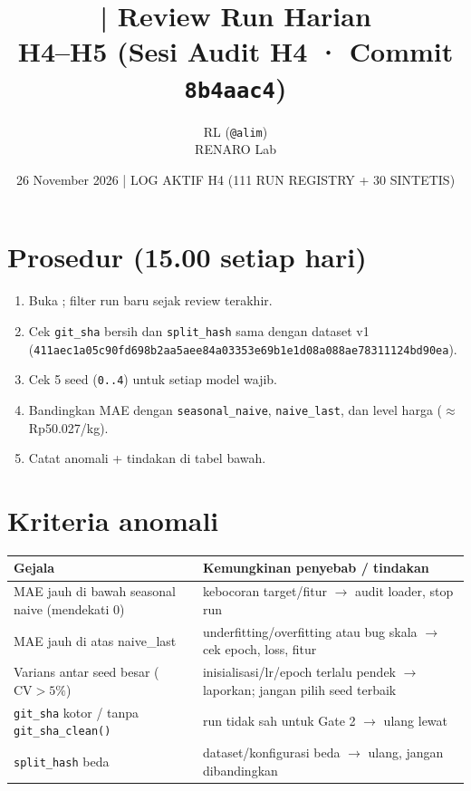 \documentclass[11pt,a4paper]{article}
\title{\jobid{RL-H4-02} | Review Run Harian\\
\large H4--H5 (Sesi Audit H4 · Commit \texttt{8b4aac4})}
\author{RL (\texttt{@alim}) \\ \small RENARO Lab}
\date{26 November 2026 \quad | \quad \textcolor{blue!70!black}{LOG AKTIF H4 (111 RUN REGISTRY + 30 SINTETIS)}}
\begin{document}
\maketitle

\section{Prosedur (15.00 setiap hari)}
\begin{enumerate}
  \item Buka ; filter run baru sejak review terakhir.
  \item Cek \texttt{git\_sha} bersih dan \texttt{split\_hash} sama dengan dataset v1
        (\texttt{411aec1a05c90fd698b2aa5aee84a03353e69b1e1d08a088ae78311124bd90ea}).
  \item Cek 5 seed (\texttt{0..4}) untuk setiap model wajib.
  \item Bandingkan MAE dengan \texttt{seasonal\_naive}, \texttt{naive\_last}, dan level harga
        ($\approx$ Rp50.027/kg).
  \item Catat anomali + tindakan di tabel bawah.
\end{enumerate}

\section{Kriteria anomali}
\begin{table}[H]
\centering
\small
\begin{tabular}{@{}L{6.4cm}L{8.2cm}@{}}
\toprule
Gejala & Kemungkinan penyebab / tindakan \\
\midrule
MAE jauh di bawah seasonal naive (mendekati 0) & kebocoran target/fitur $\to$ audit loader, stop run \\
MAE jauh di atas naive\_last & underfitting/overfitting atau bug skala $\to$ cek epoch, loss, fitur \\
Varians antar seed besar ($\text{CV} > 5\%$) & inisialisasi/lr/epoch terlalu pendek $\to$ laporkan; jangan pilih seed terbaik \\
\texttt{git\_sha} kotor / tanpa \texttt{git\_sha\_clean()} & run tidak sah untuk Gate 2 $\to$ ulang lewat  \\
\texttt{split\_hash} beda & dataset/konfigurasi beda $\to$ ulang, jangan dibandingkan \\
\bottomrule
\end{tabular}
\end{table}
\end{document}
